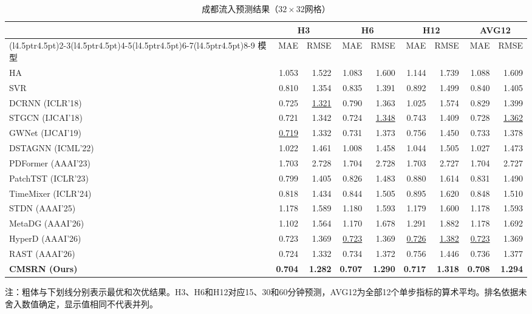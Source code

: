 \begin{table}[!htbp]
\centering
\caption{成都流入预测结果（\(32\times32\)网格）}
\label{tab:chengdu-inflow}
\begingroup
\linespread{1}\fontsize{10}{12}\selectfont
\setlength{\tabcolsep}{4.5pt}
\renewcommand{\arraystretch}{1.05}
\begin{tabular*}{\linewidth}{@{\extracolsep{\fill}}l*{8}{r}@{}}
\toprule
& \multicolumn{2}{c}{H3} & \multicolumn{2}{c}{H6} & \multicolumn{2}{c}{H12} & \multicolumn{2}{c}{AVG12} \\
\cmidrule(l{4.5pt}r{4.5pt}){2-3}\cmidrule(l{4.5pt}r{4.5pt}){4-5}\cmidrule(l{4.5pt}r{4.5pt}){6-7}\cmidrule(l{4.5pt}r{4.5pt}){8-9}
模型 & MAE & RMSE & MAE & RMSE & MAE & RMSE & MAE & RMSE \\
\midrule
HA & 1.053 & 1.522 & 1.083 & 1.600 & 1.144 & 1.739 & 1.088 & 1.609 \\
SVR & 0.810 & 1.354 & 0.835 & 1.391 & 0.892 & 1.499 & 0.840 & 1.405 \\
DCRNN (ICLR'18) & 0.725 & \underline{1.321} & 0.790 & 1.363 & 1.025 & 1.574 & 0.829 & 1.399 \\
STGCN (IJCAI'18) & 0.721 & 1.342 & 0.724 & \underline{1.348} & 0.743 & 1.409 & 0.728 & \underline{1.362} \\
GWNet (IJCAI'19) & \underline{0.719} & 1.332 & 0.731 & 1.373 & 0.756 & 1.450 & 0.733 & 1.378 \\
DSTAGNN (ICML'22) & 1.022 & 1.461 & 1.008 & 1.458 & 1.044 & 1.505 & 1.027 & 1.473 \\
PDFormer (AAAI'23) & 1.703 & 2.728 & 1.704 & 2.728 & 1.703 & 2.727 & 1.704 & 2.727 \\
PatchTST (ICLR'23) & 0.799 & 1.405 & 0.826 & 1.483 & 0.880 & 1.614 & 0.831 & 1.490 \\
TimeMixer (ICLR'24) & 0.818 & 1.434 & 0.844 & 1.505 & 0.895 & 1.620 & 0.848 & 1.510 \\
STDN (AAAI'25) & 1.178 & 1.589 & 1.180 & 1.593 & 1.179 & 1.600 & 1.178 & 1.593 \\
MetaDG (AAAI'26) & 1.102 & 1.564 & 1.170 & 1.678 & 1.291 & 1.882 & 1.178 & 1.692 \\
HyperD (AAAI'26) & 0.723 & 1.369 & \underline{0.723} & 1.369 & \underline{0.726} & \underline{1.382} & \underline{0.723} & 1.369 \\
RAST (AAAI'26) & 0.724 & 1.332 & 0.734 & 1.372 & 0.756 & 1.446 & 0.736 & 1.377 \\
\midrule
\textbf{CMSRN (Ours)} & \textbf{0.704} & \textbf{1.282} & \textbf{0.707} & \textbf{1.290} & \textbf{0.717} & \textbf{1.318} & \textbf{0.708} & \textbf{1.294} \\
\bottomrule
\end{tabular*}
\endgroup
\par\smallskip
\begin{minipage}{\linewidth}
\footnotesize\linespread{1.1}\selectfont\raggedright
注：粗体与下划线分别表示最优和次优结果。H3、H6和H12对应15、30和60分钟预测，AVG12为全部12个单步指标的算术平均。排名依据未舍入数值确定，显示值相同不代表并列。
\end{minipage}
\end{table}
